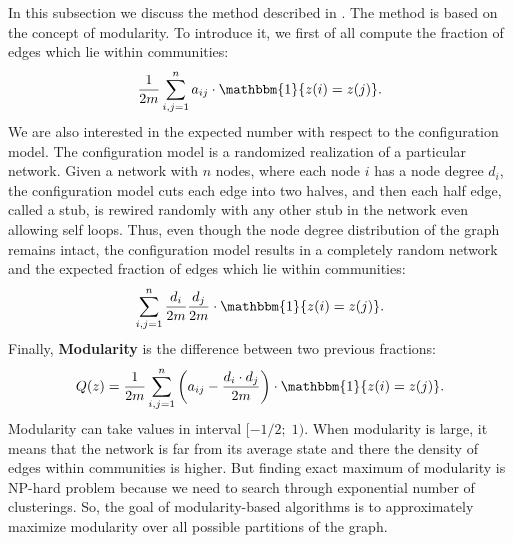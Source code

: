In this subsection we discuss the method described in \cite{modularity}.
The method is based on the concept of modularity. To introduce it, we first of all compute the fraction of edges which lie within communities:
    \begin{equation}
        \begin{aligned}
            \frac{1}{2m} \sum\limits_{i,j=1}^{n} a_{ij} \cdot \mathbbm{1}\{ z(i) = z(j) \}.
        \nonumber
        \end{aligned}
    \end{equation}
We are also interested in the expected number with respect to the configuration model. The configuration model is a randomized realization of a particular network. Given a network with $n$ nodes, where each node $i$ has a node degree $d_i$, the configuration model cuts each edge into two halves, and then each half edge, called a stub, is rewired randomly with any other stub in the network even allowing self loops. Thus, even though the node degree distribution of the graph remains intact, the configuration model results in a completely random network and the expected fraction of edges which lie within communities:
    \begin{equation}
        \begin{aligned}
            \sum\limits_{i,j=1}^{n}\frac{d_i}{2m}\frac{d_j}{2m} \cdot \mathbbm{1}\{ z(i) = z(j) \}.
            \nonumber
        \end{aligned}
    \end{equation}
Finally, \textbf{Modularity} is the difference between two previous fractions:
    \begin{equation}
        \begin{aligned}
            Q(z) = 
            \frac{1}{2m} \sum\limits_{i,j=1}^{n} \left(a_{ij} - \frac{d_i\cdot d_j}{2m}\right) \cdot \mathbbm{1}\{ z(i) = z(j) \}.
        \nonumber
        \end{aligned}
    \end{equation}
Modularity can take values in interval $[-1/2;\;1)$.
When modularity is large, it means that the network is far from its average state and there the density of edges within communities is higher.
But finding exact maximum of modularity is NP-hard problem because we need to search through exponential number of clusterings.
So, the goal of modularity-based algorithms is to approximately maximize modularity over all possible partitions of the graph.

